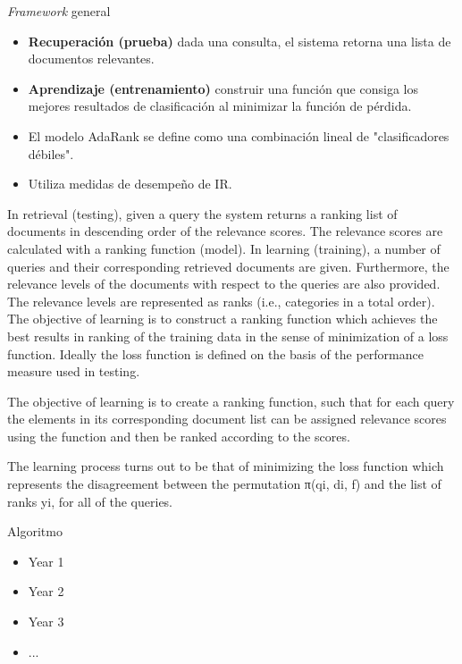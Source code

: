 \documentclass{beamer}
\begin{document}
\begin{frame}{\textit{Framework} general}
    \begin{itemize}%
        \item \textbf{Recuperación (prueba)} dada una consulta, el sistema retorna una lista de documentos relevantes.
        \item \textbf{Aprendizaje (entrenamiento)} construir una función que consiga los mejores resultados de clasificación al minimizar la función de pérdida.
        \item El modelo AdaRank se define como una combinación lineal de "clasificadores débiles".
        \item Utiliza medidas de desempeño de IR.
    \end{itemize}
    
    \begin{note}
        {In retrieval (testing), given a query the system returns a ranking list of documents in descending order of the relevance scores. The relevance scores are calculated with a ranking function (model). In learning (training), a number of queries and their corresponding retrieved documents are given. Furthermore, the relevance levels of the documents with respect to the queries are also provided. The relevance levels are represented as ranks (i.e., categories in a total order). The objective of learning is to construct a ranking function which achieves the best results in ranking of the training data in the sense of minimization of a loss function. Ideally the loss function is defined on the basis of the performance measure used in testing.

        The objective of learning is to create a ranking function, such that for each query the elements in its corresponding document list can be assigned relevance scores using the function and then be ranked according to the scores.
        
        The learning process turns out to be that of minimizing the loss function which represents the disagreement between the permutation π(qi, di, f) and the list of ranks yi, for all of the queries.}
    \end{note}
\end{frame}

\begin{frame}{Algoritmo}
    \begin{itemize}
        \item Year 1
        \item Year 2
        \item Year 3
        \item ...
    \end{itemize}

    \begin{note}
        {}
    \end{note}
\end{frame}
\end{document}
